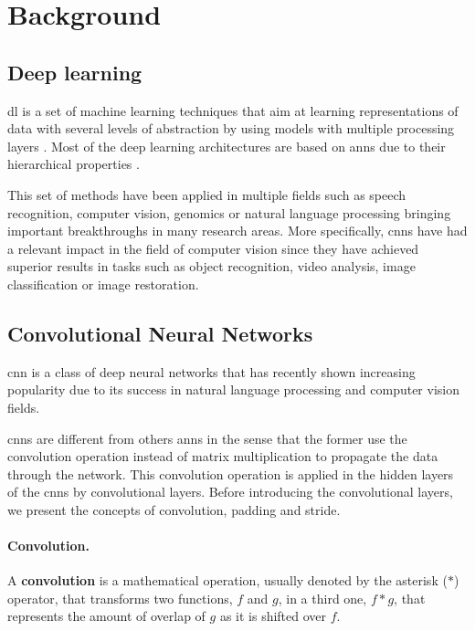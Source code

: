 \section{Background}\label{sec:background}

\subsection{Deep learning}
\gls{dl} is a set of machine learning techniques that aim at learning representations of data with several levels of abstraction by using models with multiple processing layers \cite{DL2}. Most of the deep learning architectures are based on \glspl{ann} due to their hierarchical properties \cite{DL1} \cite{DBLP:DEEPSISR}.

This set of methods have been applied in multiple fields such as speech recognition, computer vision, genomics or natural language processing bringing important breakthroughs in many research areas. More specifically, \glspl{cnn} have had a relevant impact in the field of computer vision since they have achieved superior results in tasks such as object recognition, video analysis, image classification or image restoration.

\subsection{Convolutional Neural Networks}
\gls{cnn} is a class of deep neural networks that has recently shown increasing popularity due to its success in natural language processing and computer vision fields.

\glspl{cnn} are different from others \glspl{ann} in the sense that the former use the convolution operation instead of matrix multiplication to propagate the data through the network. This convolution operation is applied in the hidden layers of the \glspl{cnn} by convolutional layers. Before introducing the convolutional layers, we present the concepts of convolution, padding and stride.

\paragraph{Convolution.} 

A \textbf{convolution} is a mathematical operation, usually denoted by the asterisk ($\ast$) operator, that transforms two functions, $f$ and $g$, in a third one, $f\ast g$, that represents the amount of overlap of $g$ as it is shifted over $f$.

